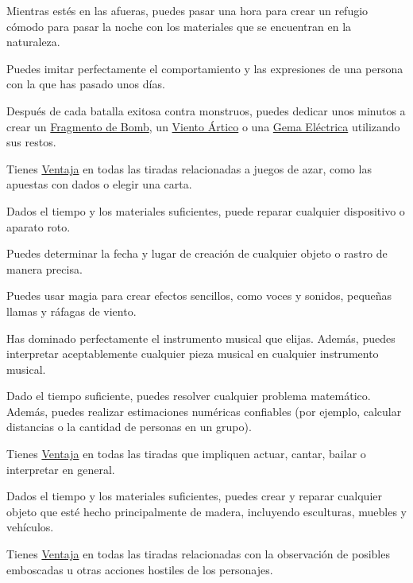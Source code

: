 \begin{description}[leftmargin=*]

{
	Mientras estés en las afueras, puedes pasar una hora para crear un refugio cómodo para pasar la noche con los materiales que se encuentran en la naturaleza.
} 

{
	Puedes imitar perfectamente el comportamiento y las expresiones de una persona con la que has pasado unos días.
}
	
{
 Después de cada batalla exitosa contra monstruos, puedes dedicar unos minutos a crear un \hyperlink{item}{Fragmento de Bomb}, un \hyperlink{item}{Viento Ártico} o una \hyperlink{item}{Gema Eléctrica} utilizando sus restos. 
}

{
	Tienes \hyperlink{check}{Ventaja} en todas las tiradas relacionadas a juegos de azar, como las apuestas con dados o elegir una carta.
}

{
	Dados el tiempo y los materiales suficientes, puede reparar cualquier dispositivo o aparato roto. 
}

{
	Puedes determinar la fecha y lugar de creación de cualquier objeto o rastro de manera precisa.
}

{
	Puedes usar magia para crear efectos sencillos, como voces y sonidos, pequeñas llamas y ráfagas de viento.
}

\pagebreak

{
	Has dominado perfectamente el instrumento musical que elijas. Además, puedes interpretar aceptablemente cualquier pieza musical en cualquier instrumento musical.
}


{
	Dado el tiempo suficiente, puedes resolver cualquier problema matemático. Además, puedes realizar estimaciones numéricas confiables (por ejemplo, calcular distancias o la cantidad de personas en un grupo).
}

{
	Tienes \hyperlink{check}{Ventaja} en todas las tiradas que impliquen actuar, cantar, bailar o interpretar en general.
}

{
	Dados el tiempo y los materiales suficientes, puedes crear y reparar cualquier objeto que esté hecho principalmente de madera, incluyendo esculturas, muebles y vehículos.
}

{
	Tienes \hyperlink{check}{Ventaja} en todas las tiradas relacionadas con la observación de posibles emboscadas u otras acciones hostiles de los personajes.
}


\end{description}
